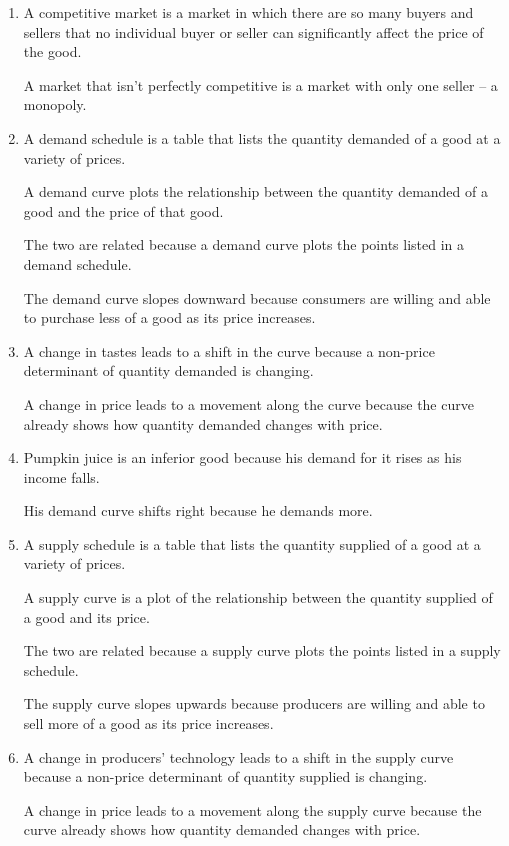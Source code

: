 \documentclass{article}
\begin{document}
\begin{enumerate}

\item A competitive market is a market in which there are so many buyers and sellers that no individual buyer or seller can significantly affect the price of the good. 

	A market that isn't perfectly competitive is a market with only one seller -- a monopoly.

\item A demand schedule is a table that lists the quantity demanded of a good at a variety of prices.

	A demand curve plots the relationship between the quantity demanded of a good and the price of that good.

	The two are related because a demand curve plots the points listed in a demand schedule.

	The demand curve slopes downward because consumers are willing and able to purchase less of a good as its price increases.

\item A change in tastes leads to a shift in the curve because a non-price determinant of quantity demanded is changing. 

	A change in price leads to a movement along the curve because the curve already shows how quantity demanded changes with price. 

\item Pumpkin juice is an inferior good because his demand for it rises as his income falls.

	His demand curve shifts right because he demands more. 

\item A supply schedule is a table that lists the quantity supplied of a good at a variety of prices.

	A supply curve is a plot of the relationship between the quantity supplied of a good and its price.
	
	The two are related because a supply curve plots the points listed in a supply schedule.
	
	The supply curve slopes upwards because producers are willing and able to sell more of a good as its price increases.
	
\item A change in producers' technology leads to a shift in the supply curve because a non-price determinant of quantity supplied is changing.

	A change in price leads to a movement along the supply curve because the curve already shows how quantity demanded changes with price.
	

\end{enumerate}
\end{document}
